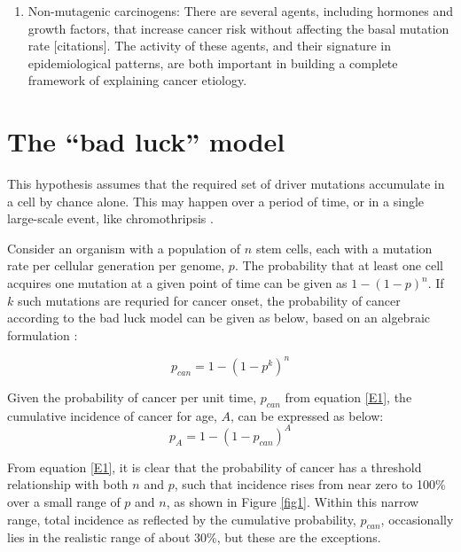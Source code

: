\documentclass[9pt,twocolumn,twoside]{pnas-new}
\begin{document}
\begin{enumerate}
	\item Non-mutagenic carcinogens: There are several agents, including hormones and growth factors, that increase cancer risk without affecting the basal mutation rate [citations]. The activity of these agents, and their signature in epidemiological patterns, are both important in building a complete framework of explaining cancer etiology.
\end{enumerate}


\section*{The ``bad luck'' model}

This hypothesis assumes that the required set of driver mutations accumulate in a cell by chance alone. This may happen over a period of time, or in a single large-scale event, like chromothripsis \cite{Stephens2011}.

Consider an organism with a population of $n$ stem cells, each with a mutation rate per cellular generation per genome, $p$. The probability that at least one cell acquires one mutation at a given point of time can be given as $1-(1-p)^{n}$. If $k$ such mutations are requried for cancer onset, the probability of cancer according to the bad luck model can be given as below, based on an algebraic formulation \cite{Calabrese2010}:

\begin{equation}
	\label{E1}
	p_{can} = 1-(1-p^{k})^{n}
\end{equation}

Given the probability of cancer per unit time, $p_{can}$ from equation \ref{E1}, the cumulative incidence of cancer for age, $A$, can be expressed as below:
\begin{equation}
	\label{E2}
	p_{A} = 1-(1-p_{can})^{A}
\end{equation}

From equation \ref{E1}, it is clear that the probability of cancer has a threshold relationship with both $n$ and $p$, such that incidence rises from near zero to 100\% over a small range of $p$ and $n$, as shown in Figure \ref{fig1}. Within this narrow range, total incidence as reflected by the cumulative probability, $p_{can}$, occasionally lies in the realistic range of about 30\%, but these are the exceptions.
\end{document}
